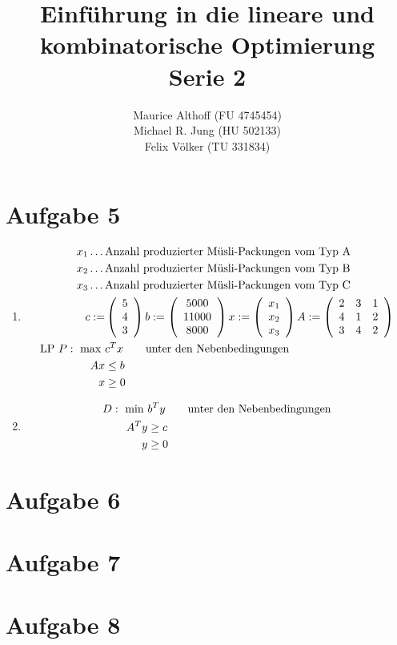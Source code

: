 \documentclass[a4paper,10pt,german]{scrartcl}
\title{Einführung in die lineare und kombinatorische Optimierung\\
Serie 2}
\author{Maurice Althoff (FU 4745454)\\Michael R. Jung (HU 502133)\\Felix Völker (TU 331834)}
\newcommand{\trivec}[3]{\ensuremath{\left(\begin{array}{ccc}
                                    #1\\
                                    #2\\
                                    #3
                                   \end{array}\right)
                                   }}
\begin{document}
\maketitle

\section*{Aufgabe 5}
 \begin{enumerate}
  \item
   \begin{align*}
     x_1\dots\,&\text{Anzahl produzierter Müsli-Packungen vom Typ A}\\
     x_2\dots\,&\text{Anzahl produzierter Müsli-Packungen vom Typ B}\\
     x_3\dots\,&\text{Anzahl produzierter Müsli-Packungen vom Typ C}\\
     c:=&\trivec543 b:=\trivec{5000}{11000}{8000}x:=\trivec{x_1}{x_2}{x_3} A:=\trivec{2&3&1}{4&1&2}{3&4&2}\\
     \text{LP }P:\ \max\ &c^Tx\hspace*{20pt} \text{unter den Nebenbedingungen}\\
     Ax&\leq b\\
     x&\geq 0
   \end{align*}
   \item
    \begin{align*}
     D:\ \min\ &b^Ty \hspace*{20pt} \text{unter den Nebenbedingungen}\\
     A^Ty&\geq c\\
     y&\geq 0
    \end{align*}
 \end{enumerate}
\section*{Aufgabe 6}
\section*{Aufgabe 7}
\section*{Aufgabe 8}
\end{document}
